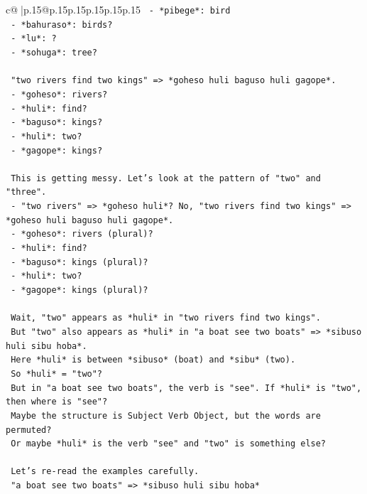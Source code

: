 \documentclass{article}
\begin{document}
{\begin{supertabular}{c@{$\;$}|p{.15\linewidth}@{}p{.15\linewidth}p{.15\linewidth}p{.15\linewidth}p{.15\linewidth}p{.15\linewidth}}
{{{\texttt{   {-} *pibege*: bird} \\
\texttt{   {-} *bahuraso*: birds?} \\
\texttt{   {-} *lu*: ?} \\
\texttt{   {-} *sohuga*: tree?} \\
\\ 
\texttt{   "two rivers find two kings" => *goheso huli baguso huli gagope*.} \\
\texttt{   {-} *goheso*: rivers?} \\
\texttt{   {-} *huli*: find?} \\
\texttt{   {-} *baguso*: kings?} \\
\texttt{   {-} *huli*: two?} \\
\texttt{   {-} *gagope*: kings?} \\
\\ 
\texttt{   This is getting messy. Let's look at the pattern of "two" and "three".} \\
\texttt{   {-} "two rivers" => *goheso huli*? No, "two rivers find two kings" => *goheso huli baguso huli gagope*.} \\
\texttt{   {-} *goheso*: rivers (plural)?} \\
\texttt{   {-} *huli*: find?} \\
\texttt{   {-} *baguso*: kings (plural)?} \\
\texttt{   {-} *huli*: two?} \\
\texttt{   {-} *gagope*: kings (plural)?} \\
\\ 
\texttt{   Wait, "two" appears as *huli* in "two rivers find two kings".} \\
\texttt{   But "two" also appears as *huli* in "a boat see two boats" => *sibuso huli sibu hoba*.} \\
\texttt{   Here *huli* is between *sibuso* (boat) and *sibu* (two).} \\
\texttt{   So *huli* = "two"?} \\
\texttt{   But in "a boat see two boats", the verb is "see". If *huli* is "two", then where is "see"?} \\
\texttt{   Maybe the structure is Subject Verb Object, but the words are permuted?} \\
\texttt{   Or maybe *huli* is the verb "see" and "two" is something else?} \\
\\ 
\texttt{   Let's re{-}read the examples carefully.} \\
\texttt{   "a boat see two boats" => *sibuso huli sibu hoba*} \\
}}}
\end{supertabular}}
\end{document}
